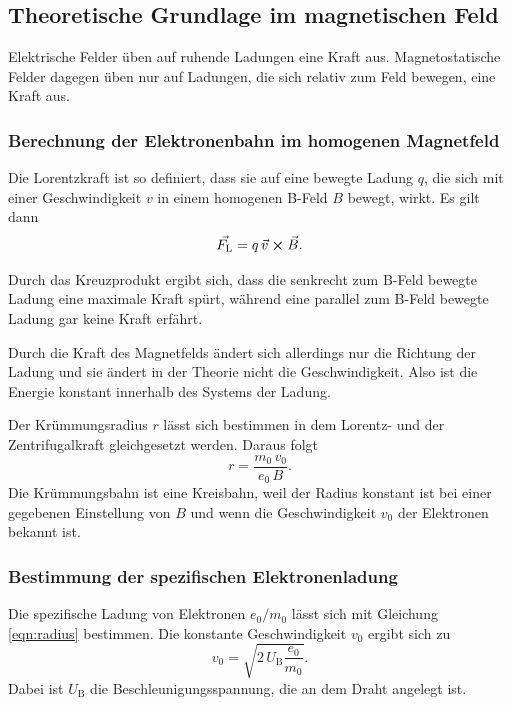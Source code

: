 \subsection{Theoretische Grundlage im magnetischen Feld}
Elektrische Felder üben auf ruhende Ladungen 
eine Kraft aus. Magnetostatische Felder dagegen üben nur auf 
Ladungen, die sich relativ zum Feld bewegen, eine Kraft aus.

\subsubsection{Berechnung der Elektronenbahn im homogenen Magnetfeld}
Die Lorentzkraft ist so definiert, dass sie auf eine bewegte Ladung $q$, die sich mit einer Geschwindigkeit $v$ in einem homogenen B-Feld $B$ bewegt, wirkt. Es gilt dann 
\begin{equation}
    \vec{F_\text{L}}= q \, \vec{v} \cross \vec{B}.
    \label{eqn:Lorentz}
\end{equation}

\noindent Durch das Kreuzprodukt ergibt sich, dass die senkrecht zum B-Feld bewegte Ladung eine maximale Kraft spürt, während eine parallel zum B-Feld bewegte Ladung gar keine Kraft erfährt.

\noindent Durch die Kraft des Magnetfelds ändert sich allerdings nur die Richtung der Ladung und sie ändert 
in der Theorie nicht die Geschwindigkeit. Also ist die Energie konstant 
innerhalb des Systems der Ladung.

\noindent Der Krümmungsradius $r$ lässt sich bestimmen in dem Lorentz- und der Zentrifugalkraft gleichgesetzt werden. Daraus folgt
\begin{equation}
    r= \frac{m_\text{0} \, v_\text{0}}{e_\text{0} \, B}.
    \label{eqn:radius}
\end{equation}
Die Krümmungsbahn ist eine Kreisbahn, weil der Radius
konstant ist bei einer gegebenen Einstellung von $B$ und wenn die Geschwindigkeit $v_0$ der Elektronen bekannt ist. 

\subsubsection{Bestimmung der spezifischen Elektronenladung}

Die spezifische 
Ladung von Elektronen $e_\text{0}/m_\text{0}$ lässt sich
mit Gleichung \eqref{eqn:radius} bestimmen. 
Die konstante Geschwindigkeit $v_\text{0}$ ergibt sich zu 
\begin{equation*}
    v_\text{0}= \sqrt{2 \, U_\text{B} \frac{e_\text{0}}{m_\text{0}}}.
\end{equation*}
Dabei ist $U_\text{B}$ die Beschleunigungsspannung, die an dem Draht angelegt ist.

